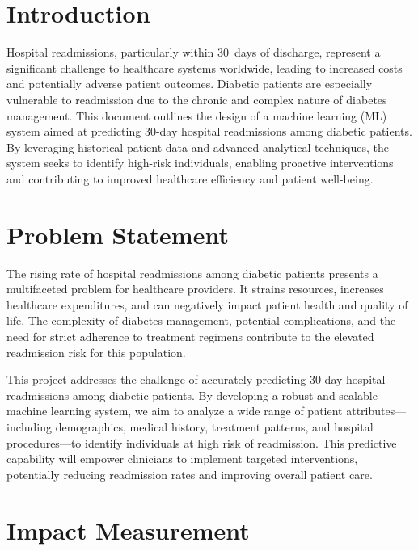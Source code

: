 \documentclass{article}
\begin{document}
\newpage
\tableofcontents
\newpage


\section{Introduction}

Hospital readmissions, particularly within 30~days of discharge, represent a significant challenge to healthcare systems worldwide, leading to increased costs and potentially adverse patient outcomes. Diabetic patients are especially vulnerable to readmission due to the chronic and complex nature of diabetes management. This document outlines the design of a machine learning (ML) system aimed at predicting 30-day hospital readmissions among diabetic patients. By leveraging historical patient data and advanced analytical techniques, the system seeks to identify high-risk individuals, enabling proactive interventions and contributing to improved healthcare efficiency and patient well-being.

\section{Problem Statement}

The rising rate of hospital readmissions among diabetic patients presents a multifaceted problem for healthcare providers. It strains resources, increases healthcare expenditures, and can negatively impact patient health and quality of life. The complexity of diabetes management, potential complications, and the need for strict adherence to treatment regimens contribute to the elevated readmission risk for this population.

This project addresses the challenge of accurately predicting 30-day hospital readmissions among diabetic patients. By developing a robust and scalable machine learning system, we aim to analyze a wide range of patient attributes---including demographics, medical history, treatment patterns, and hospital procedures---to identify individuals at high risk of readmission. This predictive capability will empower clinicians to implement targeted interventions, potentially reducing readmission rates and improving overall patient care.

\section{Impact Measurement}
\end{document}

